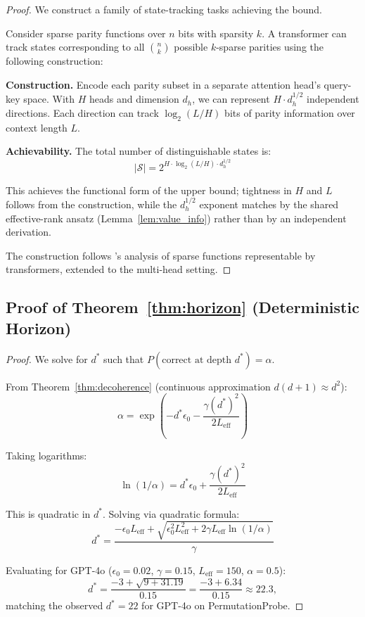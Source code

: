 \documentclass{article}
\theoremstyle{plain}
\theoremstyle{definition}
\theoremstyle{remark}
\newcommand{\Leff}{L_{\mathrm{eff}}}
\begin{document}
\begin{proof}
We construct a family of state-tracking tasks achieving the bound.

Consider sparse parity functions over $n$ bits with sparsity $k$. A transformer can track states corresponding to all $\binom{n}{k}$ possible $k$-sparse parities using the following construction:

\textbf{Construction.} Encode each parity subset in a separate attention head's query-key space. With $H$ heads and dimension $d_h$, we can represent $H \cdot d_h^{1/2}$ independent directions. Each direction can track $\log_2(L/H)$ bits of parity information over context length $L$.

\textbf{Achievability.} The total number of distinguishable states is:
\begin{equation}
|\mathcal{S}| = 2^{H \cdot \log_2(L/H) \cdot d_h^{1/2}}
\end{equation}

This achieves the functional form of the upper bound; tightness in $H$ and $L$ follows from the construction, while the $d_h^{1/2}$ exponent matches by the shared effective-rank ansatz (Lemma~\ref{lem:value_info}) rather than by an independent derivation.

The construction follows \citet{sanford2024representational}'s analysis of sparse functions representable by transformers, extended to the multi-head setting.
\end{proof}

\subsection{Proof of Theorem~\ref{thm:horizon} (Deterministic Horizon)}

\begin{proof}
We solve for $d^*$ such that $P(\text{correct at depth } d^*) = \alpha$.

From Theorem~\ref{thm:decoherence} (continuous approximation $d(d+1) \approx d^2$):
\begin{equation}
\alpha = \exp\left(-d^*\epsilon_0 - \frac{\gamma (d^*)^2}{2\Leff}\right)
\end{equation}

Taking logarithms:
\begin{equation}
\ln(1/\alpha) = d^*\epsilon_0 + \frac{\gamma (d^*)^2}{2\Leff}
\end{equation}

This is quadratic in $d^*$. Solving via quadratic formula:
\begin{equation}
d^* = \frac{-\epsilon_0 \Leff + \sqrt{\epsilon_0^2 \Leff^2 + 2\gamma \Leff \ln(1/\alpha)}}{\gamma}
\end{equation}

Evaluating for GPT-4o ($\epsilon_0 = 0.02$, $\gamma = 0.15$, $\Leff = 150$, $\alpha = 0.5$):
\begin{equation}
d^* = \frac{-3 + \sqrt{9 + 31.19}}{0.15} = \frac{-3 + 6.34}{0.15} \approx 22.3,
\end{equation}
matching the observed $d^* = 22$ for GPT-4o on PermutationProbe.
\end{proof}
\end{document}
